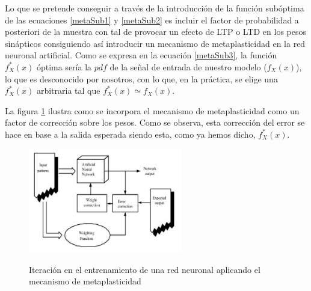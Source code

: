 \documentclass[10pt,a4paper]{report}
\begin{document}
Lo que se pretende conseguir a través de la introducción de la función subóptima de las ecuaciones \ref{metaSub1} y \ref{metaSub2} es incluir el factor de probabilidad a posteriori de la muestra con tal de provocar un efecto de LTP o LTD en los pesos sinápticos consiguiendo así introducir un mecanismo de metaplasticidad en la red neuronal artificial.
Como se expresa en la ecuación \ref{metaSub3}, la función $f^*_X(x)$ óptima sería la $pdf$ de la señal de entrada de nuestro modelo ($f_X(x)$), lo que es desconocido por nosotros, con lo que, en la práctica, se elige una $f^*_X(x)$ arbitraria tal que $f^*_X(x) \simeq f_X(x)$.

La figura \ref{fig:WeightedTrainEpoch} ilustra como se incorpora el mecanismo de metaplasticidad como un factor de corrección sobre los pesos. Como se observa, esta corrección del error se hace en base a la salida esperada siendo esta, como ya hemos dicho, $f^*_X(x)$.

\begin{figure}[h!]{}
    \centering
    \includegraphics[width=0.6\textwidth]{img/weightingOperation.png}
    \label{fig:WeightedTrainEpoch}
    \caption{Iteración en el entrenamiento de una red neuronal aplicando el mecanismo de metaplasticidad}
\end{figure}
\end{document}
